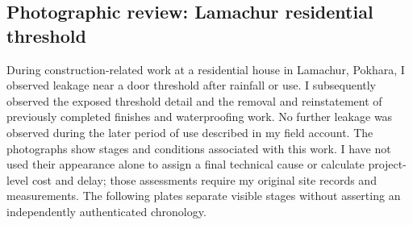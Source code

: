 \subsection{Photographic review: Lamachur residential threshold}
During construction-related work at a residential house in Lamachur, Pokhara, I observed leakage near a door threshold after rainfall or use. I subsequently observed the exposed threshold detail and the removal and reinstatement of previously completed finishes and waterproofing work. No further leakage was observed during the later period of use described in my field account. The photographs show stages and conditions associated with this work. I have not used their appearance alone to assign a final technical cause or calculate project-level cost and delay; those assessments require my original site records and measurements. The following plates separate visible stages without asserting an independently authenticated chronology.


